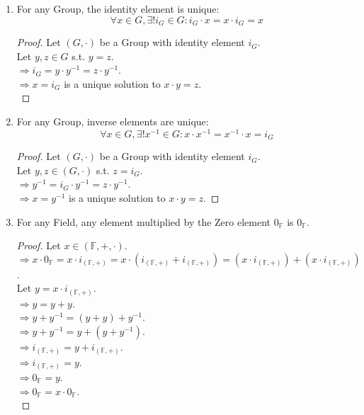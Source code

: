 \documentclass{article}
\begin{document}
\begin{enumerate}
				\item For any Group, the identity element is unique:
				$$\forall x \in G, \exists ! i_G \in G: i_G \cdot x = x \cdot i_G = x$$
				\begin{proof}
					Let $(G, \cdot)$ be a Group with identity element $i_G$. \\
					Let $y, z \in G$ s.t. $y = z$. \\
					$\Rightarrow i_G = y \cdot y^{-1} = z \cdot y^{-1}$. \\
					$\Rightarrow x = i_G$ is a unique solution to $x \cdot y = z$. \\
				\end{proof}

				\item For any Group, inverse elements are unique:
				$$\forall x \in G, \exists ! x^{-1} \in G: x \cdot x^{-1} = x^{-1} \cdot x = i_G$$
				\begin{proof}
					Let $(G, \cdot)$ be a Group with identity element $i_G$. \\
					Let $y, z \in (G, \cdot)$ s.t. $z = i_G$. \\
					$\Rightarrow y^{-1} = i_G \cdot y^{-1} = z \cdot y^{-1}$. \\
					$\Rightarrow x = y^{-1}$ is a unique solution to $x \cdot y = z$.
				\end{proof}

				\item For any Field, any element multiplied by the Zero element $0_{\mathbb{F}}$ is $0_{\mathbb{F}}$.
				\begin{proof}
					Let $x \in (\mathbb{F}, +, \cdot)$. \\
					$\Rightarrow x \cdot 0_{\mathbb{F}} = x \cdot i_{(\mathbb{F}, +)} = x \cdot (i_{(\mathbb{F}, +)} + i_{(\mathbb{F}, +)}) = (x \cdot i_{(\mathbb{F}, +)}) + (x \cdot i_{(\mathbb{F}, +)})$. \\
					Let $y = x \cdot i_{(\mathbb{F}, +)}$. \\
					$\Rightarrow y = y + y$. \\
					$\Rightarrow y + y^{-1} = (y + y) + y^{-1}$. \\
					$\Rightarrow y + y^{-1} = y + (y + y^{-1})$. \\
					$\Rightarrow i_{(\mathbb{F}, +)} = y + i_{(\mathbb{F}, +)}$. \\
					$\Rightarrow i_{(\mathbb{F}, +)} = y$. \\
					$\Rightarrow 0_{\mathbb{F}} = y$. \\
					$\Rightarrow 0_{\mathbb{F}} = x \cdot 0_{\mathbb{F}}$. \\


\end{proof}
\end{enumerate}
\end{document}
